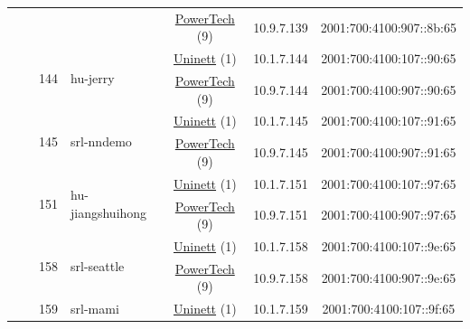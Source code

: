 \begin{small}
\begin{center}
\begin{longtable}{|c|c|c|c|c|c|c|c|}
  &  &  &  & \multicolumn{2}{|c|}{\tiny{\href{http://www.powertech.no}{PowerTech} (9)}} & \tiny{10.9.7.139} & \tiny{2001:700:4100:907::8b:65} \\* \cline{3-3}\cline{4-4}\cline{5-5}\cline{6-6}\cline{7-7}\cline{8-8}
  &  & \multirow{2}{*}{\tiny{144}} & \multicolumn{1}{|l|}{\multirow{2}{*}{\tiny{hu-jerry}}} & \multicolumn{2}{|c|}{\tiny{\href{https://www.uninett.no}{Uninett} (1)}} & \tiny{10.1.7.144} & \tiny{2001:700:4100:107::90:65} \\* \cline{5-5}\cline{6-6}\cline{7-7}\cline{8-8}
  &  &  &  & \multicolumn{2}{|c|}{\tiny{\href{http://www.powertech.no}{PowerTech} (9)}} & \tiny{10.9.7.144} & \tiny{2001:700:4100:907::90:65} \\* \cline{3-3}\cline{4-4}\cline{5-5}\cline{6-6}\cline{7-7}\cline{8-8}
  &  & \multirow{2}{*}{\tiny{145}} & \multicolumn{1}{|l|}{\multirow{2}{*}{\tiny{srl-nndemo}}} & \multicolumn{2}{|c|}{\tiny{\href{https://www.uninett.no}{Uninett} (1)}} & \tiny{10.1.7.145} & \tiny{2001:700:4100:107::91:65} \\* \cline{5-5}\cline{6-6}\cline{7-7}\cline{8-8}
  &  &  &  & \multicolumn{2}{|c|}{\tiny{\href{http://www.powertech.no}{PowerTech} (9)}} & \tiny{10.9.7.145} & \tiny{2001:700:4100:907::91:65} \\* \cline{3-3}\cline{4-4}\cline{5-5}\cline{6-6}\cline{7-7}\cline{8-8}
  &  & \multirow{2}{*}{\tiny{151}} & \multicolumn{1}{|l|}{\multirow{2}{*}{\tiny{hu-jiangshuihong}}} & \multicolumn{2}{|c|}{\tiny{\href{https://www.uninett.no}{Uninett} (1)}} & \tiny{10.1.7.151} & \tiny{2001:700:4100:107::97:65} \\* \cline{5-5}\cline{6-6}\cline{7-7}\cline{8-8}
  &  &  &  & \multicolumn{2}{|c|}{\tiny{\href{http://www.powertech.no}{PowerTech} (9)}} & \tiny{10.9.7.151} & \tiny{2001:700:4100:907::97:65} \\* \cline{3-3}\cline{4-4}\cline{5-5}\cline{6-6}\cline{7-7}\cline{8-8}
  &  & \multirow{2}{*}{\tiny{158}} & \multicolumn{1}{|l|}{\multirow{2}{*}{\tiny{srl-seattle}}} & \multicolumn{2}{|c|}{\tiny{\href{https://www.uninett.no}{Uninett} (1)}} & \tiny{10.1.7.158} & \tiny{2001:700:4100:107::9e:65} \\* \cline{5-5}\cline{6-6}\cline{7-7}\cline{8-8}
  &  &  &  & \multicolumn{2}{|c|}{\tiny{\href{http://www.powertech.no}{PowerTech} (9)}} & \tiny{10.9.7.158} & \tiny{2001:700:4100:907::9e:65} \\* \cline{3-3}\cline{4-4}\cline{5-5}\cline{6-6}\cline{7-7}\cline{8-8}
  &  & \multirow{2}{*}{\tiny{159}} & \multicolumn{1}{|l|}{\multirow{2}{*}{\tiny{srl-mami}}} & \multicolumn{2}{|c|}{\tiny{\href{https://www.uninett.no}{Uninett} (1)}} & \tiny{10.1.7.159} & \tiny{2001:700:4100:107::9f:65} \\* \cline{5-5}\cline{6-6}\cline{7-7}\cline{8-8}

\end{longtable}
\end{center}
\end{small}
